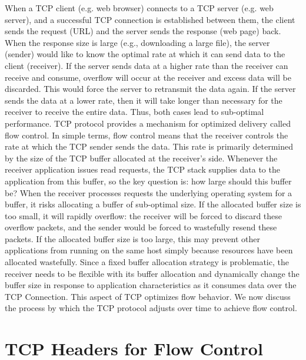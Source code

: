 \begin{multicols}{2}
When a TCP client (e.g. web browser) connects to a TCP server (e.g. web server), and a successful TCP connection is established between them, the client sends the request (URL) and the server sends the response (web page) back. When the response size is large (e.g., downloading a large file), the server (sender) would like to know the optimal rate at which it can send data to the client (receiver). If the server sends data at a higher rate than the receiver can receive and consume, overflow will occur at the receiver and excess data will be discarded. This would force the server to retransmit the data again. If the server sends the data at a lower rate, then it will take longer than necessary for the receiver to receive the entire data. Thus, both cases lead to sub-optimal performance. TCP protocol provides a mechanism for optimized delivery called flow control. In simple terms, flow control means that the receiver controls the rate at which the TCP sender sends the data. This rate is primarily determined by the size of the TCP buffer allocated at the receiver’s side. Whenever the receiver application issues read requests, the TCP stack supplies data to the application from this buffer, so the key question is: how large should this buffer be? When the receiver processes requests the underlying operating system for a buffer, it risks allocating a buffer of sub-optimal size. If the allocated buffer size is too small, it will rapidly overflow: the receiver will be forced to discard these overflow packets, and the sender would be forced to wastefully resend these packets. If the allocated buffer size is too large, this may prevent other applications from running on the same host simply because resources have been allocated wastefully. Since a fixed buffer allocation strategy is problematic, the receiver needs to be flexible with its buffer allocation and dynamically change the buffer size in response to application characteristics as it consumes data over the TCP Connection. This aspect of TCP optimizes flow behavior. We now discuss the process by which the TCP protocol adjusts over time to achieve flow control.

\section{TCP Headers for Flow Control}


\end{multicols}
